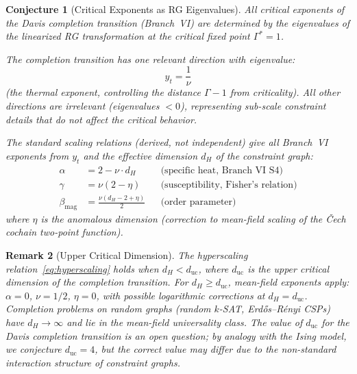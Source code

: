 \documentclass[11pt,letterpaper]{article}
\newtheorem{conjecture}{Conjecture}[section]
\newtheorem{remark}[conjecture]{Remark}
\begin{document}
\begin{conjecture}[Critical Exponents as RG 
Eigenvalues]\label{conj:rg_exponents}
All critical exponents of the Davis completion transition 
(Branch~VI) are determined by the eigenvalues of the linearized 
RG transformation at the critical fixed point $\Gamma^* = 1$.

The completion transition has one relevant direction with 
eigenvalue:
\begin{equation}\label{eq:yt}
    y_t = \frac{1}{\nu}
\end{equation}
(the thermal exponent, controlling the distance $\Gamma - 1$ 
from criticality). All other directions are irrelevant 
(eigenvalues $< 0$), representing sub-scale constraint 
details that do not affect the critical behavior.

The standard scaling relations (derived, not independent) 
give all Branch~VI exponents from $y_t$ and the effective 
dimension $d_H$ of the constraint graph:
\begin{align}
    \alpha &= 2 - \nu \cdot d_H 
    && \text{(specific heat, Branch~VI S4)}
    \label{eq:hyperscaling}\\
    \gamma &= \nu(2 - \eta) 
    && \text{(susceptibility, Fisher's relation)}
    \label{eq:fisher}\\
    \beta_{\mathrm{mag}} &= \frac{\nu(d_H - 2 + \eta)}{2} 
    && \text{(order parameter)}
    \label{eq:beta_mag}
\end{align}
where $\eta$ is the anomalous dimension (correction to mean-field 
scaling of the \v{C}ech cochain two-point function).
\end{conjecture}

\begin{remark}[Upper Critical Dimension]\label{rem:upper_critical}
The hyperscaling relation~\eqref{eq:hyperscaling} holds when 
$d_H < d_{\mathrm{uc}}$, where $d_{\mathrm{uc}}$ is the 
\emph{upper critical dimension} of the completion transition. For 
$d_H \geq d_{\mathrm{uc}}$, mean-field exponents apply: $\alpha = 
0$, $\nu = 1/2$, $\eta = 0$, with possible logarithmic corrections 
at $d_H = d_{\mathrm{uc}}$. Completion problems on random graphs 
(random $k$-SAT, Erd\H{o}s--R\'enyi CSPs) have $d_H \to \infty$ 
and lie in the mean-field universality class. The value of 
$d_{\mathrm{uc}}$ for the Davis completion transition is an open 
question; by analogy with the Ising model, we conjecture 
$d_{\mathrm{uc}} = 4$, but the correct value may differ due to the 
non-standard interaction structure of constraint graphs.
\end{remark}
\end{document}
